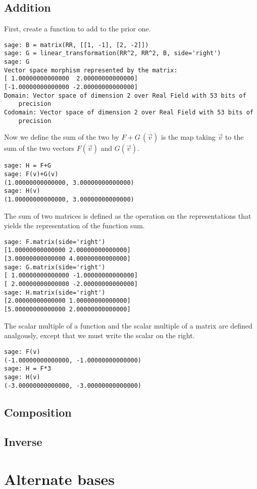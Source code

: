 \subsection{Addition}
First, create a function to add to the prior one. 
\begin{lstlisting}
sage: B = matrix(RR, [[1, -1], [2, -2]])
sage: G = linear_transformation(RR^2, RR^2, B, side='right')
sage: G
Vector space morphism represented by the matrix:
[ 1.00000000000000  2.00000000000000]
[-1.00000000000000 -2.00000000000000]
Domain: Vector space of dimension 2 over Real Field with 53 bits of 
    precision
Codomain: Vector space of dimension 2 over Real Field with 53 bits of 
    precision
\end{lstlisting}

Now we define the sum of the two by $F+G\,(\vec{v})$ is the map taking
$\vec{v}$ to the sum of the two vectors $F(\vec{v})$ and $G(\vec{v})$.
\begin{lstlisting}
sage: H = F+G
sage: F(v)+G(v)
(1.00000000000000, 3.00000000000000)
sage: H(v)
(1.00000000000000, 3.00000000000000)  
\end{lstlisting}

The sum of two matrices is defined as the operation on the representations
that yields the representation of the function sum.
\begin{lstlisting}
sage: F.matrix(side='right')
[1.00000000000000 2.00000000000000]
[3.00000000000000 4.00000000000000]
sage: G.matrix(side='right')
[ 1.00000000000000 -1.00000000000000]
[ 2.00000000000000 -2.00000000000000]
sage: H.matrix(side='right')
[2.00000000000000 1.00000000000000]
[5.00000000000000 2.00000000000000]  
\end{lstlisting}

The scalar multiple of a function and the scalar multiple of a matrix are
defined analgously, except that we must write the scalar on the right.
\begin{lstlisting}
sage: F(v)
(-1.00000000000000, -1.00000000000000)
sage: H = F*3
sage: H(v)
(-3.00000000000000, -3.00000000000000)  
\end{lstlisting}





\subsection{Composition}

\subsection{Inverse}








\section{Alternate bases}






\endinput


TODO:
